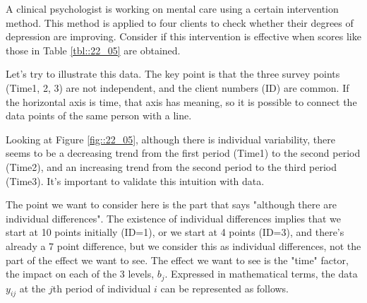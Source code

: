 \documentclass{ltjbook}
\begin{document}
A clinical psychologist is working on mental care using a certain intervention method. This method is applied to four clients to check whether their degrees of depression are improving. Consider if this intervention is effective when scores like those in Table \ref{tbl::22_05} are obtained.

Let's try to illustrate this data. The key point is that the three survey points (Time1, 2, 3) are not independent, and the client numbers (ID) are common. If the horizontal axis is time, that axis has meaning, so it is possible to connect the data points of the same person with a line.


Looking at Figure \ref{fig::22_05}, although there is individual variability, there seems to be a decreasing trend from the first period (Time1) to the second period (Time2), and an increasing trend from the second period to the third period (Time3). It's important to validate this intuition with data.

The point we want to consider here is the part that says "although there are individual differences". The existence of individual differences implies that we start at 10 points initially (ID=1), or we start at 4 points (ID=3), and there's already a 7 point difference, but we consider this as individual differences, not the part of the effect we want to see. The effect we want to see is the "time" factor, the impact on each of the 3 levels, $b_j$. Expressed in mathematical terms, the data $y_{ij}$ at the $j$th period of individual $i$ can be represented as follows.
\end{document}
